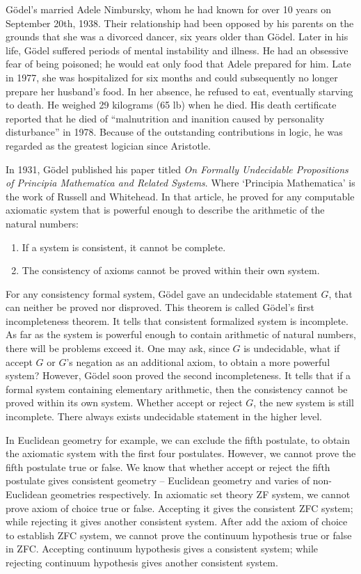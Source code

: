 \documentclass{article}
\begin{document}
Gödel's married Adele Nimbursky, whom he had known for over 10 years on September 20th, 1938. Their relationship had been opposed by his parents on the grounds that she was a divorced dancer, six years older than Gödel. Later in his life, Gödel suffered periods of mental instability and illness. He had an obsessive fear of being poisoned; he would eat only food that Adele prepared for him. Late in 1977, she was hospitalized for six months and could subsequently no longer prepare her husband's food. In her absence, he refused to eat, eventually starving to death. He weighed 29 kilograms (65 lb) when he died. His death certificate reported that he died of ``malnutrition and inanition caused by personality disturbance'' in 1978. Because of the outstanding contributions in logic, he was regarded as the greatest logician since Aristotle.

In 1931, Gödel published his paper titled {\em On Formally Undecidable Propositions of Principia Mathematica and Related Systems}. Where `Principia Mathematica' is the work of Russell and Whitehead. In that article, he proved for any computable axiomatic system that is powerful enough to describe the arithmetic of the natural numbers:

\begin{enumerate}
\item If a system is consistent, it cannot be complete.
\item The consistency of axioms cannot be proved within their own system.
\end{enumerate}

For any consistency formal system, Gödel gave an undecidable statement $G$, that can neither be proved nor disproved. This theorem is called Gödel's first incompleteness theorem. It tells that consistent formalized system is incomplete. As far as the system is powerful enough to contain arithmetic of natural numbers, there will be problems exceed it. One may ask, since $G$ is undecidable, what if accept $G$ or $G$'s negation as an additional axiom, to obtain a more powerful system? However, Gödel soon proved the second incompleteness. It tells that if a formal system containing elementary arithmetic, then the consistency cannot be proved within its own system. Whether accept or reject $G$, the new system is still incomplete. There always exists undecidable statement in the higher level.

In Euclidean geometry for example, we can exclude the fifth postulate, to obtain the axiomatic system with the first four postulates. However, we cannot prove the fifth postulate true or false. We know that whether accept or reject the fifth postulate gives consistent geometry -- Euclidean geometry and varies of non-Euclidean geometries respectively. In axiomatic set theory ZF system, we cannot prove axiom of choice true or false. Accepting it gives the consistent ZFC system; while rejecting it gives another consistent system. After add the axiom of choice to establish ZFC system, we cannot prove the continuum hypothesis true or false in ZFC. Accepting continuum hypothesis gives a consistent system; while rejecting continuum hypothesis gives another consistent system.
\end{document}
